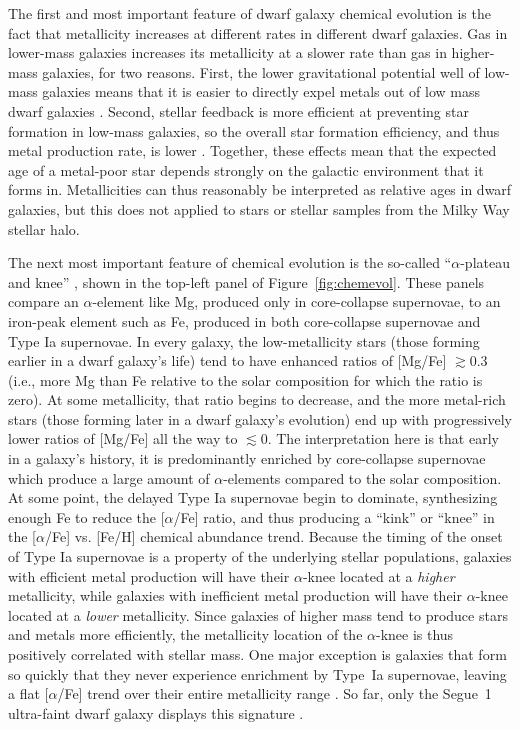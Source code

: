 \documentclass[letterpaper]{article}
\begin{document}
The first and most important feature of dwarf galaxy chemical evolution is the fact that metallicity increases at different rates in different dwarf galaxies.
Gas in lower-mass galaxies increases its metallicity at a slower rate than gas in higher-mass galaxies, for two reasons. First, the lower gravitational potential well of low-mass galaxies means that it is easier to directly expel metals out of low mass dwarf galaxies \citep[e.g.,][]{Dekel2003,Kirby11b,Brauer2021}.
Second, stellar feedback is more efficient at preventing star formation in low-mass galaxies, so the overall star formation efficiency, and thus metal production rate, is lower \citep[e.g.,][]{Ishimaru15,Ji2016b}.
Together, these effects mean that the expected age of a metal-poor star depends strongly on the galactic environment that it forms in. Metallicities can thus reasonably be interpreted as relative ages in dwarf galaxies, but this does not applied to stars or stellar samples from the Milky Way stellar halo.

The next most important feature of chemical evolution is the so-called ``$\alpha$-plateau and knee'' \citep{Tinsley80,Matteucci1990,Tolstoy2009}, shown in the top-left panel of Figure~\ref{fig:chemevol}.
These panels compare an $\alpha$-element like Mg, produced only in core-collapse supernovae, to an iron-peak element such as Fe, produced in both core-collapse supernovae and Type Ia supernovae.
In every galaxy, the low-metallicity stars (those forming earlier in a dwarf galaxy's life) tend to have enhanced ratios of [Mg/Fe] $\gtrsim 0.3$ (i.e., more Mg than Fe relative to the solar composition for which the ratio is zero).
At some metallicity, that ratio begins to decrease, and the more metal-rich stars (those forming later in a dwarf galaxy's evolution) end up with progressively lower ratios of [Mg/Fe] all the way to ${\lesssim} 0$.
The interpretation here is that early in a galaxy's history, it is predominantly enriched by core-collapse supernovae which produce a large amount of $\alpha$-elements compared to the solar composition.
At some point, the delayed Type Ia supernovae begin to dominate, synthesizing enough Fe to reduce the [$\alpha$/Fe] ratio, and thus producing a ``kink'' or ``knee'' in the [$\alpha$/Fe] vs. [Fe/H] chemical abundance trend.
Because the timing of the onset of Type Ia supernovae is a property of the underlying stellar populations, galaxies with efficient metal production will have their $\alpha$-knee located at a \emph{higher} metallicity, while galaxies with inefficient metal production will have their $\alpha$-knee located at a \emph{lower} metallicity.
Since galaxies of higher mass tend to produce stars and metals more efficiently, the metallicity location of the $\alpha$-knee is thus positively correlated with stellar mass. One major exception is galaxies that form so quickly that they never experience enrichment by Type~Ia supernovae, leaving a flat [$\alpha$/Fe] trend over their entire metallicity range \citep{frebel12}. So far, only the Segue~1 ultra-faint dwarf galaxy displays this signature \citep{Frebel2014}.
\end{document}
